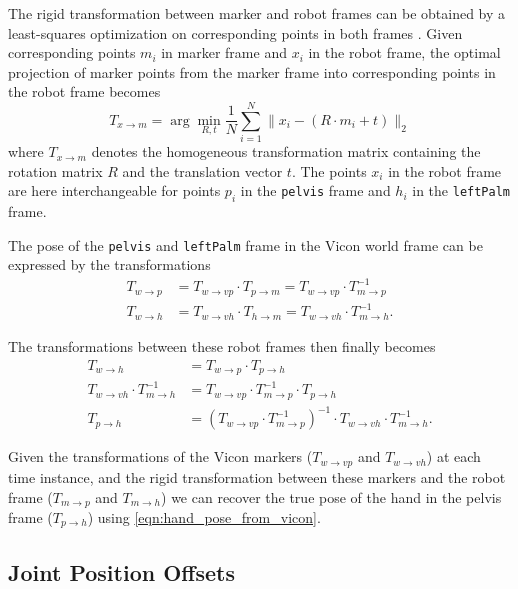 The rigid transformation between marker and robot frames can be obtained by a least-squares optimization on corresponding points in both frames \cite{Umeyama1991}. Given corresponding points $m_i$ in marker frame and $x_i$ in the robot frame, the optimal projection of marker points from the marker frame into corresponding points in the robot frame becomes
\begin{equation}
T_{x \rightarrow m} = \arg\min_{R,t} \frac{1}{N} \sum_{i=1}^N \lVert x_i - \left( R \cdot m_i + t \right) \rVert_2
\label{eqn:least_squares_transformation_estimation}
\end{equation}
where $T_{x \rightarrow m}$ denotes the homogeneous transformation matrix containing the rotation matrix $R$ and the translation vector $t$. The points $x_i$ in the robot frame are here interchangeable for points $p_i$ in the \texttt{pelvis} frame and $h_i$ in the \texttt{leftPalm} frame.

The pose of the \texttt{pelvis} and \texttt{leftPalm} frame in the Vicon world frame can be expressed by the transformations
\begin{align}
T_{w \rightarrow p} &= T_{w \rightarrow vp} \cdot T_{p \rightarrow m} = T_{w \rightarrow vp} \cdot T_{m \rightarrow p}^{-1} \\
T_{w \rightarrow h} &= T_{w \rightarrow vh} \cdot T_{h \rightarrow m} = T_{w \rightarrow vh} \cdot T_{m \rightarrow h}^{-1} .
\end{align}

The transformations between these robot frames then finally becomes
\begin{align}
T_{w \rightarrow h} &= T_{w \rightarrow p} \cdot T_{p \rightarrow h} \\
T_{w \rightarrow vh} \cdot T_{m \rightarrow h}^{-1} &= T_{w \rightarrow vp} \cdot T_{m \rightarrow p}^{-1} \cdot T_{p \rightarrow h} \nonumber \\
T_{p \rightarrow h} &= \left( T_{w \rightarrow vp} \cdot T_{m \rightarrow p}^{-1} \right)^{-1} \cdot T_{w \rightarrow vh} \cdot T_{m \rightarrow h}^{-1} \label{eqn:hand_pose_from_vicon} .
\end{align}

Given the transformations of the Vicon markers ($T_{w \rightarrow vp}$ and $T_{w \rightarrow vh}$) at each time instance, and the rigid transformation between these markers and the robot frame ($T_{m \rightarrow p}$ and $T_{m \rightarrow h}$) we can recover the true pose of the hand in the pelvis frame ($T_{p \rightarrow h}$) using \cref{eqn:hand_pose_from_vicon}.


\subsection{Joint Position Offsets}
